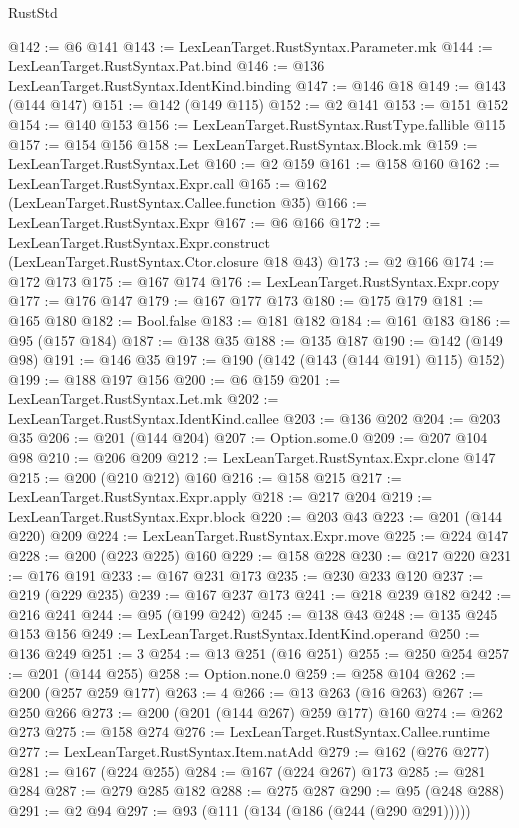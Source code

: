 \begin{lexlean}{RustStd}
\begin{coremodule}
@142 := @6 @141
@143 := LexLeanTarget.RustSyntax.Parameter.mk
@144 := LexLeanTarget.RustSyntax.Pat.bind
@146 := @136 LexLeanTarget.RustSyntax.IdentKind.binding
@147 := @146 @18
@149 := @143 (@144 @147)
@151 := @142 (@149 @115)
@152 := @2 @141
@153 := @151 @152
@154 := @140 @153
@156 := LexLeanTarget.RustSyntax.RustType.fallible @115
@157 := @154 @156
@158 := LexLeanTarget.RustSyntax.Block.mk
@159 := LexLeanTarget.RustSyntax.Let
@160 := @2 @159
@161 := @158 @160
@162 := LexLeanTarget.RustSyntax.Expr.call
@165 := @162 (LexLeanTarget.RustSyntax.Callee.function @35)
@166 := LexLeanTarget.RustSyntax.Expr
@167 := @6 @166
@172 := LexLeanTarget.RustSyntax.Expr.construct (LexLeanTarget.RustSyntax.Ctor.closure @18 @43)
@173 := @2 @166
@174 := @172 @173
@175 := @167 @174
@176 := LexLeanTarget.RustSyntax.Expr.copy
@177 := @176 @147
@179 := @167 @177 @173
@180 := @175 @179
@181 := @165 @180
@182 := Bool.false
@183 := @181 @182
@184 := @161 @183
@186 := @95 (@157 @184)
@187 := @138 @35
@188 := @135 @187
@190 := @142 (@149 @98)
@191 := @146 @35
@197 := @190 (@142 (@143 (@144 @191) @115) @152)
@199 := @188 @197 @156
@200 := @6 @159
@201 := LexLeanTarget.RustSyntax.Let.mk
@202 := LexLeanTarget.RustSyntax.IdentKind.callee
@203 := @136 @202
@204 := @203 @35
@206 := @201 (@144 @204)
@207 := Option.some.{0}
@209 := @207 @104 @98
@210 := @206 @209
@212 := LexLeanTarget.RustSyntax.Expr.clone @147
@215 := @200 (@210 @212) @160
@216 := @158 @215
@217 := LexLeanTarget.RustSyntax.Expr.apply
@218 := @217 @204
@219 := LexLeanTarget.RustSyntax.Expr.block
@220 := @203 @43
@223 := @201 (@144 @220) @209
@224 := LexLeanTarget.RustSyntax.Expr.move
@225 := @224 @147
@228 := @200 (@223 @225) @160
@229 := @158 @228
@230 := @217 @220
@231 := @176 @191
@233 := @167 @231 @173
@235 := @230 @233 @120
@237 := @219 (@229 @235)
@239 := @167 @237 @173
@241 := @218 @239 @182
@242 := @216 @241
@244 := @95 (@199 @242)
@245 := @138 @43
@248 := @135 @245 @153 @156
@249 := LexLeanTarget.RustSyntax.IdentKind.operand
@250 := @136 @249
@251 := 3
@254 := @13 @251 (@16 @251)
@255 := @250 @254
@257 := @201 (@144 @255)
@258 := Option.none.{0}
@259 := @258 @104
@262 := @200 (@257 @259 @177)
@263 := 4
@266 := @13 @263 (@16 @263)
@267 := @250 @266
@273 := @200 (@201 (@144 @267) @259 @177) @160
@274 := @262 @273
@275 := @158 @274
@276 := LexLeanTarget.RustSyntax.Callee.runtime
@277 := LexLeanTarget.RustSyntax.Item.natAdd
@279 := @162 (@276 @277)
@281 := @167 (@224 @255)
@284 := @167 (@224 @267) @173
@285 := @281 @284
@287 := @279 @285 @182
@288 := @275 @287
@290 := @95 (@248 @288)
@291 := @2 @94
@297 := @93 (@111 (@134 (@186 (@244 (@290 @291)))))

\end{coremodule}
\end{lexlean}
